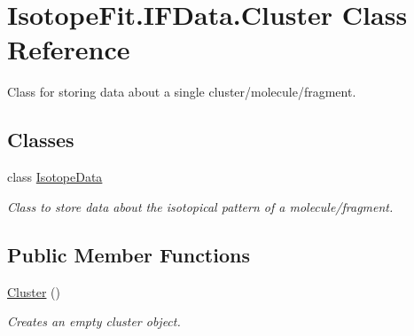\hypertarget{class_isotope_fit_1_1_i_f_data_1_1_cluster}{}\section{Isotope\+Fit.\+I\+F\+Data.\+Cluster Class Reference}
\label{class_isotope_fit_1_1_i_f_data_1_1_cluster}


Class for storing data about a single cluster/molecule/fragment.  


\subsection*{Classes}
\begin{DoxyCompactItemize}
\item 
class \mbox{\hyperlink{class_isotope_fit_1_1_i_f_data_1_1_cluster_1_1_isotope_data}{Isotope\+Data}}
\begin{DoxyCompactList}\small\item\em Class to store data about the isotopical pattern of a molecule/fragment. \end{DoxyCompactList}\end{DoxyCompactItemize}
\subsection*{Public Member Functions}
\begin{DoxyCompactItemize}
\item 
\mbox{\hyperlink{class_isotope_fit_1_1_i_f_data_1_1_cluster_ada019f0710b46fddad5f74a541deb4da}{Cluster}} ()
\begin{DoxyCompactList}\small\item\em Creates an empty cluster object. \end{DoxyCompactList}\end{DoxyCompactItemize}
